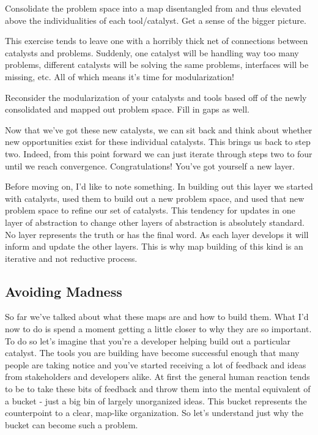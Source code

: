\documentclass[10pt,a5paper]{book}
\begin{document}
Consolidate the problem space into a map disentangled from and thus elevated above the individualities of each tool/catalyst. Get a sense of the bigger picture.\linebreak

This exercise tends to leave one with a horribly thick net of connections between catalysts and problems. Suddenly, one catalyst will be handling way too many problems, different catalysts will be solving the same problems, interfaces will be missing, etc. All of which means it's time for modularization!\linebreak

Reconsider the modularization of your catalysts and tools based off of the newly consolidated and mapped out problem space. Fill in gaps as well.\linebreak

Now that we've got these new catalysts, we can sit back and think about whether new opportunities exist for these individual catalysts. This brings us back to step two. Indeed, from this point forward we can just iterate through steps two to four until we reach convergence. Congratulations! You've got yourself a new layer.

Before moving on, I'd like to note something. In building out this layer we started with catalysts, used them to build out a new problem space, and used that new problem space to refine our set of catalysts. This tendency for updates in one layer of abstraction to change other layers of abstraction is absolutely standard. No layer represents the truth or has the final word. As each layer develops it will inform and update the other layers. This is why map building of this kind is an iterative and not reductive process. 

\subsection{Avoiding Madness}
So far we've talked about what these maps are and how to build them. What I'd now to do is spend a moment getting a little closer to why they are so important. To do so let's imagine that you're a developer helping build out a particular catalyst. The tools you are building have become successful enough that many people are taking notice and you've started receiving a lot of feedback and ideas from stakeholders and developers alike. At first the general human reaction tends to be to take these bits of feedback and throw them into the mental equivalent of a bucket - just a big bin of largely unorganized ideas. This bucket represents the counterpoint to a clear, map-like organization. So let's understand just why the bucket can become such a problem. 
\end{document}
